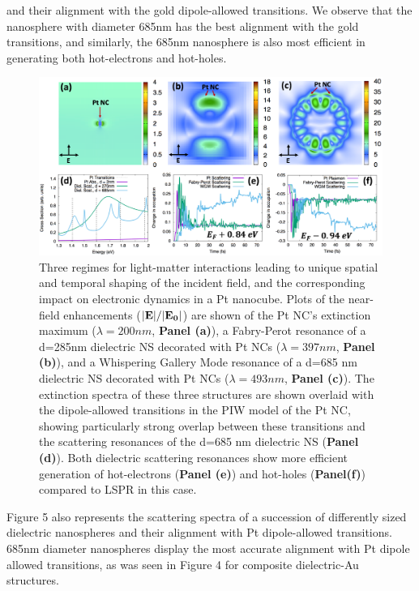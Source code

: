 \documentclass[journal=jpclcd,manuscript=letter]{achemso}
\begin{document}
and their alignment with the gold dipole-allowed transitions. We observe that the nanosphere with diameter 685nm 
has the best alignment with the gold transitions, and similarly, the 685nm nanosphere is also most efficient 
in generating both hot-electrons and hot-holes. 
\begin{figure}
\begin{center}
\includegraphics[width=6in]{figs/Pt_AllThree_Alternate.png}
\caption{Three regimes for light-matter interactions leading to unique
spatial and temporal shaping of the incident field, and the corresponding
impact on electronic dynamics in a Pt nanocube. Plots of the near-field enhancements (${\bf |E|}/{\bf |E_0|}$) are shown of the
Pt NC's extinction maximum ($\lambda=200 nm$, {\bf Panel (a)}), a Fabry-Perot resonance of a d=285nm dielectric NS decorated with Pt NCs 
($\lambda = 397 nm$, {\bf Panel (b)}),
and a Whispering Gallery Mode resonance of a d=685 nm dielectric NS decorated with Pt NCs ($\lambda = 493 nm$, {\bf Panel (c)}).
The extinction spectra of these three structures are shown overlaid with the dipole-allowed transitions in the PIW model of the Pt NC, showing particularly
strong overlap between these transitions and the scattering resonances of the d=685 nm dielectric NS ({\bf Panel (d)}).
Both dielectric scattering resonances show more efficient generation of hot-electrons ({\bf Panel (e)}) and hot-holes ({\bf Panel(f)}) compared to LSPR in this case.}
\end{center}
\end{figure}

Figure 5 also represents the scattering spectra of a succession of differently sized dielectric nanospheres and their alignment with 
Pt dipole-allowed transitions. 685nm diameter nanospheres display the most accurate alignment with Pt dipole allowed 
transitions, as was seen in Figure 4 for composite dielectric-Au structures. 
\end{document}
